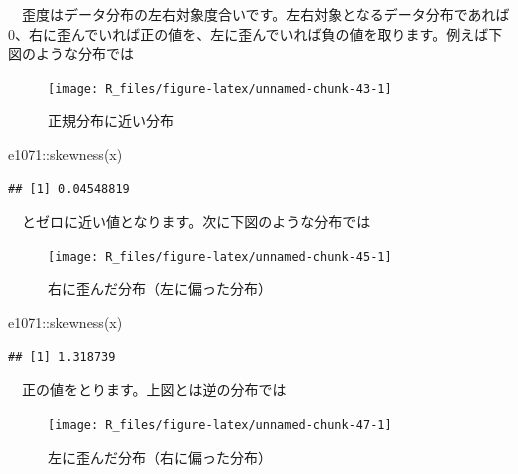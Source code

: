 \documentclass[
  12pt,
]{book}
\newenvironment{Shaded}{\begin{snugshade}}{\end{snugshade}}
\newcommand{\FunctionTok}[1]{\textcolor[rgb]{0.00,0.00,0.00}{#1}}
\newcommand{\NormalTok}[1]{#1}
\newcommand{\SpecialCharTok}[1]{\textcolor[rgb]{0.00,0.00,0.00}{#1}}
\begin{document}
　歪度はデータ分布の左右対象度合いです。左右対象となるデータ分布であれば\(0\)、右に歪んでいれば正の値を、左に歪んでいれば負の値を取ります。例えば下図のような分布では

\begin{figure}[H]

{\centering \texttt{[image: R\_files/figure-latex/unnamed-chunk-43-1]} 

}

\caption{正規分布に近い分布}\label{fig:unnamed-chunk-43}
\end{figure}

\begin{Shaded}
\begin{Highlighting}[numbers=left,,]
\NormalTok{e1071}\SpecialCharTok{::}\FunctionTok{skewness}\NormalTok{(x)}
\end{Highlighting}
\end{Shaded}

\begin{verbatim}
## [1] 0.04548819
\end{verbatim}

　とゼロに近い値となります。次に下図のような分布では

\begin{figure}[H]

{\centering \texttt{[image: R\_files/figure-latex/unnamed-chunk-45-1]} 

}

\caption{右に歪んだ分布（左に偏った分布）}\label{fig:unnamed-chunk-45}
\end{figure}

\begin{Shaded}
\begin{Highlighting}[numbers=left,,]
\NormalTok{e1071}\SpecialCharTok{::}\FunctionTok{skewness}\NormalTok{(x)}
\end{Highlighting}
\end{Shaded}

\begin{verbatim}
## [1] 1.318739
\end{verbatim}

　正の値をとります。上図とは逆の分布では

\begin{figure}[H]

{\centering \texttt{[image: R\_files/figure-latex/unnamed-chunk-47-1]} 

}

\caption{左に歪んだ分布（右に偏った分布）}\label{fig:unnamed-chunk-47}
\end{figure}
\end{document}
